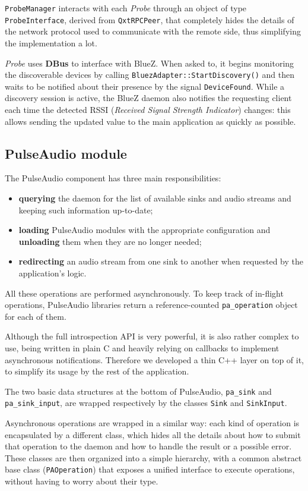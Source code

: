 \documentclass[conference]{IEEEtran}
\newcommand{\Probe}{\textsl{Probe}}
\begin{document}
\texttt{ProbeManager} interacts with each \Probe{} through an object of type \texttt{ProbeInterface}, derived from \texttt{QxtRPCPeer}, that completely hides the details of the network protocol used to communicate with the remote side, thus simplifying the implementation a lot.

\Probe{} uses \textbf{DBus} to interface with BlueZ. When asked to, it begins monitoring the discoverable devices by calling \texttt{BluezAdapter::StartDiscovery()} and then waits to be notified about their presence by the signal \texttt{DeviceFound}. While a discovery session is active, the BlueZ daemon also notifies the requesting client each time the detected RSSI (\textit{Received Signal Strength Indicator}) changes: this allows sending the updated value to the main application as quickly as possible.

\subsection{PulseAudio module}
The PulseAudio component has three main responsibilities:
\begin{itemize}
	\item \textbf{querying} the daemon for the list of available sinks and audio streams and keeping such information up-to-date;
	\item \textbf{loading} PulseAudio modules with the appropriate configuration and \textbf{unloading} them when they are no longer needed;
	\item \textbf{redirecting} an audio stream from one sink to another when requested by the application's logic.
\end{itemize}
All these operations are performed asynchronously. To keep track of in-flight operations, PulseAudio libraries return a reference-counted \texttt{pa\_operation} object for each of them.

Although the full introspection API is very powerful, it is also rather complex to use, being written in plain C and heavily relying on callbacks to implement asynchronous notifications. Therefore we developed a thin C++ layer on top of it, to simplify its usage by the rest of the application.

The two basic data structures at the bottom of PulseAudio, \texttt{pa\_sink} and \texttt{pa\_sink\_input}, are wrapped respectively by the classes \texttt{Sink} and \texttt{SinkInput}.

Asynchronous operations are wrapped in a similar way: each kind of operation is encapsulated by a different class, which hides all the details about how to submit that operation to the daemon and how to handle the result or a possible error. These classes are then organized into a simple hierarchy, with a common abstract base class (\texttt{PAOperation}) that exposes a unified interface to execute operations, without having to worry about their type.
\end{document}
